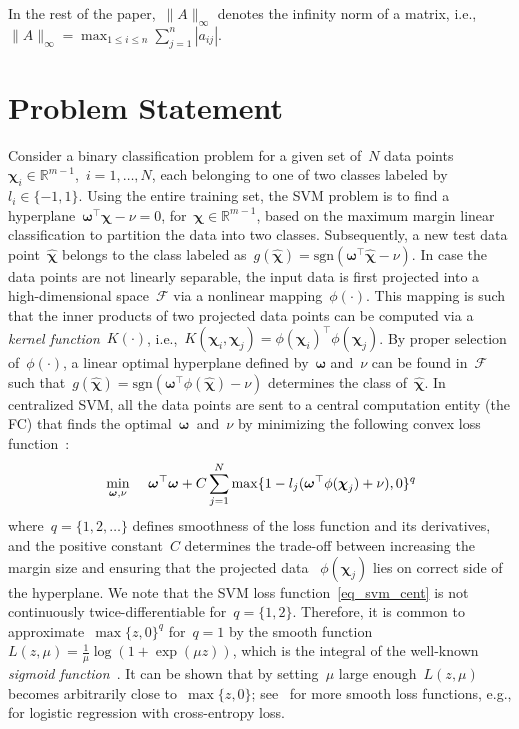 \documentclass[letterpaper, 10pt, conference]{ieeeconf}
\def\mbb{\mathbb}
\def\mc{\mathcal}
\begin{document}
In the rest of the paper,~${\lVert A\rVert_{\infty}}$ denotes the infinity norm of a matrix, i.e.,~$\lVert A\rVert_{\infty}= \max_{1\leq i\leq n} \sum_{j=1}^n |a_{ij}|.$

\section{Problem Statement} \label{sec_prob}
Consider a binary classification problem for a given set of~$N$ data points~$\boldsymbol{\chi}_i \in \mathbb{R}^{m-1}$,~$i=1,\ldots,N$, each belonging to one of two classes labeled by~${l_i \in \{-1,1\}}$. Using the entire training set, the SVM problem is to find a hyperplane~${\boldsymbol{\omega}^\top \boldsymbol{\chi} - \nu =0}$,  for~${\boldsymbol{\chi}\in\mbb R^{m-1}}$, based on the maximum margin linear classification to partition the data into two classes. Subsequently, a new test data point~$\widehat{\boldsymbol{\chi}}$ belongs to the class labeled  as~${g(\widehat{\boldsymbol{\chi}})= \text{sgn}(\boldsymbol{\omega}^\top \widehat{\boldsymbol{\chi}} - \nu)}$.  In case the data points are not linearly separable, the input data is first projected into a high-dimensional space~$\mc{F}$ via a nonlinear mapping~$\phi(\cdot)$. This mapping is such that the inner products of two projected data points can be computed via a \textit{kernel function}~$K(\cdot)$, i.e.,~$K(\boldsymbol{\chi}_i,\boldsymbol{\chi}_j)=\phi(\boldsymbol{\chi}_i)^\top \phi(\boldsymbol{\chi}_j)$. By proper selection of~$\phi(\cdot)$, a linear optimal  hyperplane defined by~$\boldsymbol{\omega}$ and~$\nu$ can be found in~$\mc{F}$ such that~${g(\widehat{\boldsymbol{\chi}})= \text{sgn}(\boldsymbol{\omega}^\top \phi(\widehat{\boldsymbol{\chi}}) - \nu)}$ determines the class of~$\widehat{\boldsymbol{\chi}}$. In centralized SVM, all the data points are sent to a central computation entity (the FC) that finds the optimal~$\boldsymbol{\omega}~$ and~$\nu$ by minimizing the following  convex loss function~\cite{chapelle2007training}:
\begin{equation} \label{eq_svm_cent}
	\begin{aligned}
		\displaystyle
		& \min_{\boldsymbol{\omega},\nu}
		~ &  \boldsymbol{\omega}^\top \boldsymbol{\omega} + C \sum_{j=1}^{N} \max\{1-l_j( \boldsymbol{\omega}^\top \phi(\boldsymbol{\chi}_j)+\nu),0\}^q
	\end{aligned}
\end{equation}
where~${q = \{1,2,\ldots\}}$ defines smoothness of the loss function and its derivatives, and the positive constant~$C$ determines the trade-off between increasing the margin size and ensuring that the projected data ~$\phi(\boldsymbol{\chi}_j)$ lies on  correct side of the hyperplane. We note that the SVM loss function~\eqref{eq_svm_cent} is not continuously twice-differentiable for~$q=\{1,2\}$. Therefore, it is common to approximate~$\max\{z,0\}^q$ for~${q=1}$ by the smooth function~${L(z,\mu)=\frac{1}{\mu}\log (1+\exp(\mu z))}$, which is the integral of the well-known \textit{sigmoid function}~\cite{garg2019fixed2}. It can be shown that by setting~$\mu$ large enough~${L(z,\mu)}$ becomes arbitrarily close to~$\max\{z,0\}$; see~\cite{slp_book} for more smooth loss functions, e.g., for logistic regression with cross-entropy loss.
\end{document}
